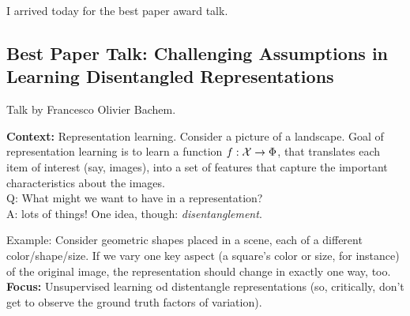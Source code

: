 I arrived today for the best paper award talk.

\subsection{Best Paper Talk: Challenging Assumptions in Learning Disentangled Representations}

Talk by Francesco Olivier Bachem. \\



{\bf Context:} Representation learning. Consider a picture of a landscape. Goal of representation learning is to learn a function $f : \mathcal{X} \rightarrow \Phi$, that translates each item of interest (say, images), into a set of features that capture the important characteristics about the images. \\

Q: What might we want to have in a representation?\\

A: lots of things! One idea, though: {\it disentanglement}. \\


Example: Consider geometric shapes placed in a scene, each of a different color/shape/size. If we vary one key aspect (a square's color or size, for instance) of the original image, the representation should change in exactly one way, too. \\

{\bf Focus:} Unsupervised learning od distentangle representations (so, critically, don't get to observe the ground truth factors of variation). \\


